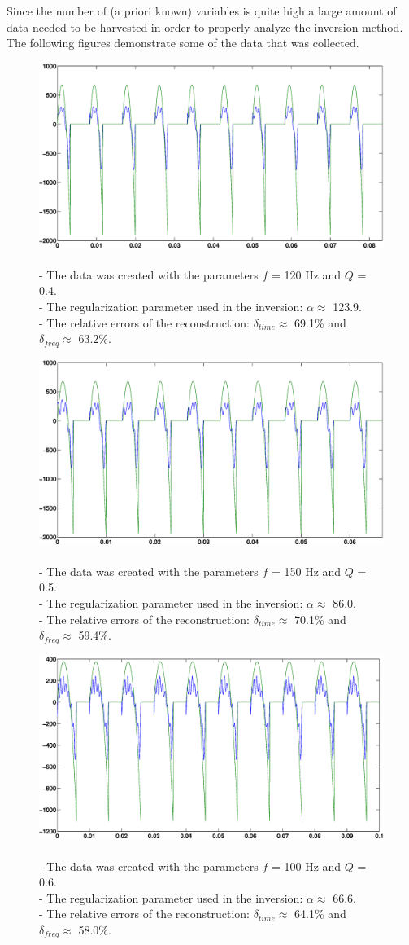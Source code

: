 \documentclass[12pt,a4]{article}
\newcommand{\inversionresult}[5]{\\
 - The data was created with the parameters $f$ = #1 Hz and $Q$ = #2.\\
 - The regularization parameter used in the inversion: $\alpha \approx$ #3.\\
 - The relative errors of the reconstruction: $\delta_{time} \approx$ #4\% and $\delta_{freq} \approx$ #5\%.}
\begin{document}
Since the number of (a priori known) variables is quite high a large amount of data needed to be harvested in order to properly analyze the inversion method. The following figures demonstrate some of the data that was collected.
\begin{figure}[H]
\begin{center}
\includegraphics[scale=.3]{img/morozov_no-crime_error-005_Qrand-0.eps}
\end{center}
\caption{\inversionresult{120}{0.4}{123.9}{69.1}{63.2}}
\label{fig:tik-1}
\end{figure}
\begin{figure}[H]
\begin{center}
\includegraphics[scale=.3]{img/morozov_no-crime_error-005_Qrand-0[V2].eps}
\end{center}
\caption{\inversionresult{150}{0.5}{86.0}{70.1}{59.4}}
\label{fig:tik-2}
\end{figure}
\begin{figure}[H]
\begin{center}
\includegraphics[scale=.3]{img/morozov_no-crime_error-005_Qrand-0[Pres].eps}
\end{center}
\caption{\inversionresult{100}{0.6}{66.6}{64.1}{58.0}}
\label{fig:tik-3}
\end{figure}
\end{document}
